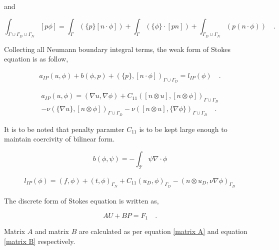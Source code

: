 \documentclass[a4paper]{book}
\begin{document}
and 

\begin{equation}
\int_{\Gamma \cup \Gamma_D \cup \Gamma_N} [p \phi] = \int_{\Gamma} (\lbrace p \rbrace [ n \cdot \phi]) + \int_{\Gamma} (\lbrace \phi \rbrace \cdot [pn]) + \int_{\Gamma_D \cup \Gamma_N} (p (n \cdot \phi) ) \quad \textrm{.}
\end{equation}

Collecting all Neumann boundary integral terms, the weak form of Stokes equation is as follow,

\begin{equation}\label{stokes_weak_ch3}
\begin{split}
a_{IP}(u,\phi) + b(\phi,p) + (\{p\},[n\cdot \phi])_{\Gamma \cup \Gamma_D} = l_{IP}(\phi) \quad \textrm{.}
\end{split}
\end{equation}

\begin{equation}
\begin{split}
a_{IP}(u,\phi) = (\nabla u, \nabla \phi) + C_{11} ([n \otimes u],[n \otimes \phi])_{\Gamma \cup \Gamma_D} \\
- \nu (\{\nabla u\},[n \otimes \phi])_{\Gamma \cup \Gamma_D} - \nu ([n \otimes u],\{\nabla \phi\})_{\Gamma \cup \Gamma_D} \quad \textrm{.}
\end{split}
\end{equation}

It is to be noted that penalty paramter $C_{11}$ is to be kept large enough to maintain coercivity of bilinear form.

\begin{equation}
b(\phi,\psi) = -\int_{\mathcal{T}} \psi \nabla \cdot \phi
\end{equation}

\begin{equation}
\begin{split}
l_{IP}(\phi) = (f,\phi) + (t,\phi)_{\Gamma_N} + C_{11} (u_D,\phi)_{\Gamma_D} - (n \otimes u_D, \nu \nabla \phi)_{\Gamma_D}
\end{split}
\end{equation}

The discrete form of Stokes equation is written as,

\begin{equation} \label{stokes discrete_ch3}
AU + BP = F_1 \quad \textrm{.}
\end{equation}

Matrix $A$ and matrix $B$ are calculated as per equation \ref{matrix A} and equation \ref{matrix B} respectively. \\
\end{document}
